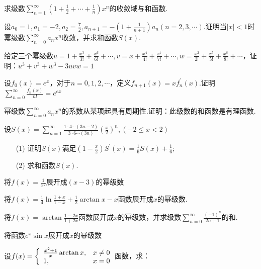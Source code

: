 \begin{xiti}
	\item 求级数$\sum _ { n = 1 } ^ { \infty } \left( 1 + \frac { 1 } { 2 } + \cdots + \frac { 1 } { n } \right) x ^ { n }$的收敛域与和函数.
	\item 设$a _ { 0 } = 1 , a _ { 1 } = - 2 , a _ { 2 } = \frac { 7 } { 2 } , a _ { n + 1 } = - \left( 1 + \frac { 1 } { n + 1 } \right) a _ { n } ( n = 2,3 , \cdots )$.证明当$|x|<1$时幂级数$\sum _ { n = 0 } ^ { \infty } a _ { n } x ^ { n }$收敛，并求和函数$S(x)$.
	\item 给定三个幂级数$u = 1 + \frac { x ^ { 3 } } { 3 ! } + \frac { x ^ { 6 } } { 6 ! } + \cdots , v = x + \frac { x ^ { 4 } } { 4 ! } + \frac { x ^ { 7 } } { 7 ! } + \cdots , w = \frac { x ^ { 2 } } { 2 ! } + \frac { x ^ { 5 } } { 5 ! } + \frac { x ^ { 8 } } { 8 ! } + \cdots$，证明：$u ^ { 3 } + v ^ { 3 } + w ^ { 3 } - 3 u v w = 1$
	\item 设$f _ { 0 } ( x ) = e ^ { x }$，对于$n = 0,1,2 , \cdots$，定义$f _ { n + 1 } ( x ) = x f _ { n } ^ { \prime } ( x )$.证明$\sum _ { n = 0 } ^ { \infty } \frac { f _ { n } ( x ) } { n ! } = e ^ { ex}$
	\item 幂级数$\sum _ { n = 0 } ^ { \infty } a _ { n } x ^ { n }$的系数从某项起具有周期性.证明：此级数的和函数是有理函数.
	\item 设$S ( x ) = \sum _ { n = 1 } ^ { \infty } \frac { 1 \cdot 4 \cdots ( 3 n - 2 ) } { 3 \cdot 6 \cdots ( 3 n ) } \left( \frac { x } { 2 } \right) ^ { n } , ( - 2 \leqslant x < 2 )$
	\begin{enumerate}
		\item [(1)]证明$S(x)$满足$\left( 1 - \frac { x } { 2 } \right) S ^ { \prime } ( x ) = \frac { 1 } { 6 } S ( x ) + \frac { 1 } { 6 }$;
		\item [(2)]求和函数$S(x)$.
	\end{enumerate}
	\item 将$f ( x ) = \frac { 1 } { x ^ { 2 } }$展开成$(x-3)$的幂级数
	\item 将$f ( x ) = \frac { 1 } { 4 } \ln \frac { 1 + x } { 1 - x } + \frac { 1 } { 2 } \arctan x - x$函数展开成$x$的幂级数.
	\item 将$f ( x ) = \arctan \frac { 1 - 2 x } { 1 + 2 x }$函数展开成$x$的幂级数，并求级数$\sum _ { n = 0 } ^ { \infty } \frac { ( - 1 ) ^ { n } } { 2 n + 1 }$的和.
	\item 将函数$e ^ { x } \sin x$展开成$x$的幂级数
	\item 设$f ( x ) = \left\{ \begin{array} { l l } { \frac { x ^ { 2 } + 1 } { x } \arctan x , } & { x \neq 0 } \\ { 1 , } & { x = 0 } \end{array} \right.$函数，求：

\end{xiti}
